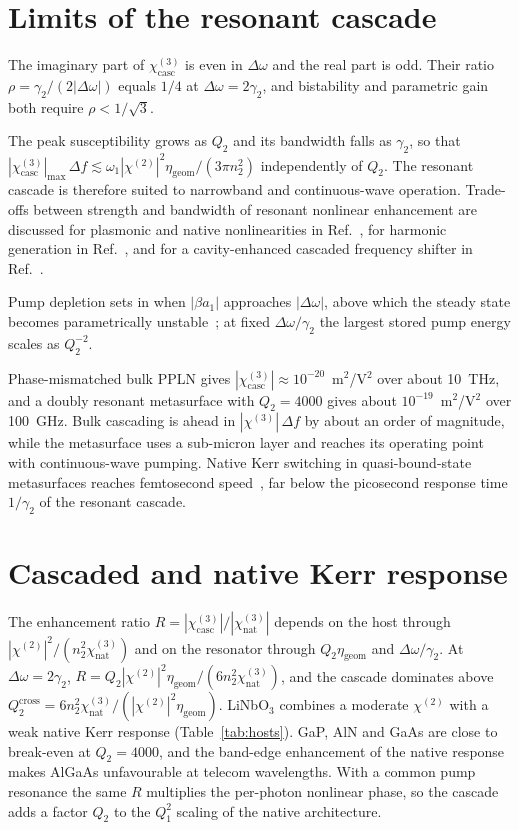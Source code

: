 \documentclass[aps,prapplied,onecolumn,superscriptaddress,longbibliography,nofootinbib]{revtex4-2}
\newcommand{\chitwo}{\chi^{(2)}}
\newcommand{\chithree}{\chi^{(3)}}
\newcommand{\chicasc}{\chi^{(3)}_{\mathrm{casc}}}
\newcommand{\chinat}{\chi^{(3)}_{\mathrm{nat}}}
\newcommand{\Dom}{\Delta\omega}
\newcommand{\etag}{\eta_{\mathrm{geom}}}
\begin{document}
\section{Limits of the resonant cascade}\label{sec:limits}

The imaginary part of $\chicasc$ is even in $\Dom$ and the real part is
odd.  Their ratio $\rho=\gamma_2/(2|\Dom|)$ equals $1/4$ at
$\Dom=2\gamma_2$, and bistability and parametric gain both require
$\rho<1/\sqrt3$.

The peak susceptibility grows as $Q_2$ and its bandwidth falls as
$\gamma_2$, so that
$|\chicasc|_{\max}\,\Delta f\lesssim\omega_1|\chitwo|^2\etag/(3\pi n_2^2)$
independently of $Q_2$.  The resonant cascade is therefore suited to
narrowband and continuous-wave operation.  Trade-offs between strength and
bandwidth of resonant nonlinear enhancement are discussed for plasmonic
and native nonlinearities in Ref.~\cite{khurgin2013}, for harmonic
generation in Ref.~\cite{shcherbakov2019}, and for a cavity-enhanced
cascaded frequency shifter in Ref.~\cite{gorbounova1996}.

Pump depletion sets in when $|\beta a_1|$ approaches $|\Dom|$, above which
the steady state becomes parametrically unstable~\cite{drummond1980}; at
fixed $\Dom/\gamma_2$ the largest stored pump energy scales as $Q_2^{-2}$.

Phase-mismatched bulk PPLN gives $|\chicasc|\approx10^{-20}$~m$^2$/V$^2$
over about 10~THz, and a doubly resonant metasurface with $Q_2=4000$ gives
about $10^{-19}$~m$^2$/V$^2$ over 100~GHz.  Bulk cascading is ahead in
$|\chithree|\,\Delta f$ by about an order of magnitude, while the
metasurface uses a sub-micron layer and reaches its operating point with
continuous-wave pumping.  Native Kerr switching in quasi-bound-state
metasurfaces reaches femtosecond speed~\cite{yang2024}, far below the
picosecond response time $1/\gamma_2$ of the resonant cascade.

\section{Cascaded and native Kerr response}\label{sec:hosts}

The enhancement ratio $R=|\chicasc|/|\chinat|$ depends on the host through
$|\chitwo|^2/(n_2^2\chinat)$ and on the resonator through $Q_2\etag$ and
$\Dom/\gamma_2$.  At $\Dom=2\gamma_2$,
$R=Q_2|\chitwo|^2\etag/(6n_2^2\chinat)$, and the cascade dominates above
$Q_2^{\mathrm{cross}}=6n_2^2\chinat/(|\chitwo|^2\etag)$.  LiNbO$_3$
combines a moderate $\chitwo$ with a weak native Kerr response
(Table~\ref{tab:hosts}).  GaP, AlN and GaAs are close to break-even at
$Q_2=4000$, and the band-edge enhancement of the native response makes
AlGaAs unfavourable at telecom wavelengths.  With a common pump resonance
the same $R$ multiplies the per-photon nonlinear phase, so the cascade
adds a factor $Q_2$ to the $Q_1^2$ scaling of the native architecture.
\end{document}
